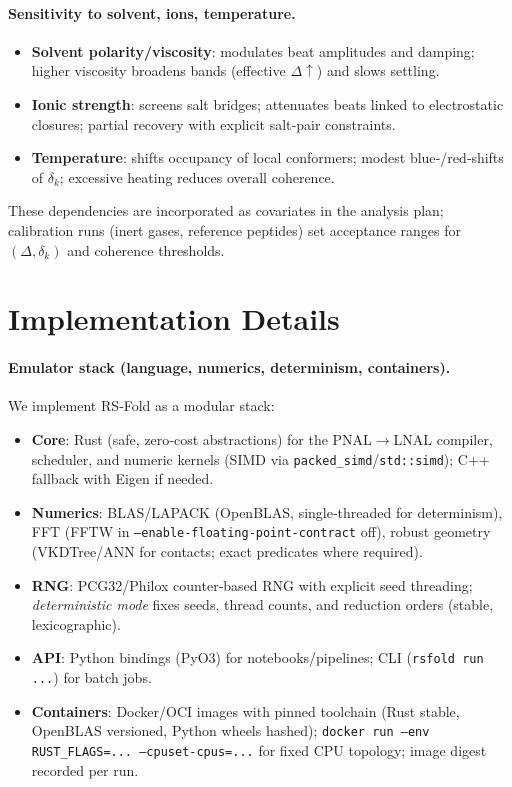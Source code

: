 \documentclass[12pt,a4paper]{article}
\begin{document}
\paragraph{Sensitivity to solvent, ions, temperature.}
\begin{itemize}
  \item \textbf{Solvent polarity/viscosity}: modulates beat amplitudes and damping; higher viscosity broadens bands (effective $\Delta\uparrow$) and slows settling.
  \item \textbf{Ionic strength}: screens salt bridges; attenuates beats linked to electrostatic closures; partial recovery with explicit salt‑pair constraints.
  \item \textbf{Temperature}: shifts occupancy of local conformers; modest blue‑/red‑shifts of $\delta_k$; excessive heating reduces overall coherence.
\end{itemize}
These dependencies are incorporated as covariates in the analysis plan; calibration runs (inert gases, reference peptides) set acceptance ranges for $(\Delta,\delta_k)$ and coherence thresholds.

\section{Implementation Details}

\paragraph{Emulator stack (language, numerics, determinism, containers).}
We implement RS‑Fold as a modular stack:
\begin{itemize}
  \item \textbf{Core}: Rust (safe, zero‑cost abstractions) for the PNAL$\to$LNAL compiler, scheduler, and numeric kernels (SIMD via \texttt{packed\_simd}/\texttt{std::simd}); C++ fallback with Eigen if needed.
  \item \textbf{Numerics}: BLAS/LAPACK (OpenBLAS, single‑threaded for determinism), FFT (FFTW in \texttt{--enable‑floating‑point‑contract} off), robust geometry (VKDTree/ANN for contacts; exact predicates where required).
  \item \textbf{RNG}: PCG32/Philox counter‑based RNG with explicit seed threading; \emph{deterministic mode} fixes seeds, thread counts, and reduction orders (stable, lexicographic).
  \item \textbf{API}: Python bindings (PyO3) for notebooks/pipelines; CLI (\texttt{rsfold run ...}) for batch jobs.
  \item \textbf{Containers}: Docker/OCI images with pinned toolchain (Rust stable, OpenBLAS versioned, Python wheels hashed); \texttt{docker run --env RUST\_FLAGS=... --cpuset‑cpus=...} for fixed CPU topology; image digest recorded per run.
\end{itemize}
\end{document}
